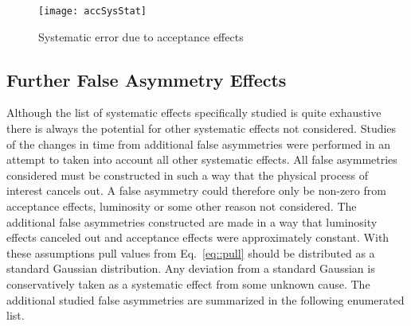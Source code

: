 \begin{figure}[h!t]
  \begin{center}
    \texttt{[image: accSysStat]}
    \caption{Systematic error due to acceptance effects}
    \label{fig::accSysStat}
  \end{center}
\end{figure}

\subsection{Further False Asymmetry Effects}
Although the list of systematic effects specifically studied is quite exhaustive
there is always the potential for other systematic effects not considered.
Studies of the changes in time from additional false asymmetries were performed
in an attempt to taken into account all other systematic effects.  All false
asymmetries considered must be constructed in such a way that the physical
process of interest cancels out.  A false asymmetry could therefore only be
non-zero from acceptance effects, luminosity or some other reason not
considered.  The additional false asymmetries constructed are made in a way that
luminosity effects canceled out and acceptance effects were approximately
constant.  With these assumptions pull values from Eq.~\ref{eq::pull} should be
distributed as a standard Gaussian distribution.  Any deviation from a standard
Gaussian is conservatively taken as a systematic effect from some unknown cause.
The additional studied false asymmetries are summarized in the following
enumerated list.

